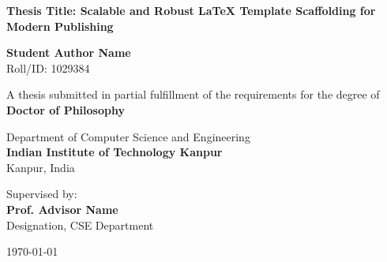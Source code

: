 \begin{titlepage}
\begin{center}
    \vspace*{1cm}
    
    
    \vspace{1.5cm}
    
    {\huge \bfseries \color{primary} Thesis Title: Scalable and Robust LaTeX Template Scaffolding for Modern Publishing}
    
    \vspace{1.5cm}
    
    {\Large \bfseries Student Author Name} \\
    \vspace{0.2cm}
    {Roll/ID: 1029384}
    
    \vspace{1.5cm}
    
    {A thesis submitted in partial fulfillment of the requirements for the degree of} \\
    \vspace{0.3cm}
    {\large \bfseries \color{secondary} Doctor of Philosophy}
    
    \vspace{1.5cm}
    
    {\large Department of Computer Science and Engineering} \\
    \vspace{0.2cm}
    {\large \bfseries \color{primary} Indian Institute of Technology Kanpur} \\
    \vspace{0.1cm}
    {Kanpur, India}
    
    \vfill
    
    {Supervised by:} \\
    {\large \bfseries Prof. Advisor Name} \\
    {Designation, CSE Department}
    
    \vspace{1cm}
    
    {\large \today}
    
\end{center}
\end{titlepage}
